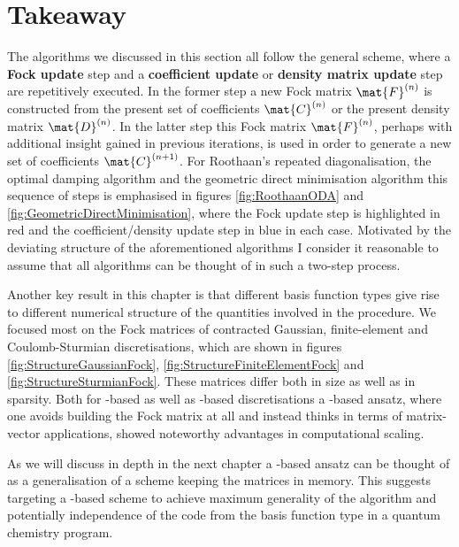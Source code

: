 \section{Takeaway}
The \SCF algorithms we discussed in this section all follow the general scheme,
where a \textbf{Fock update} step and
a \textbf{coefficient update} or \textbf{density matrix update}
step are repetitively executed.
In the former step a new Fock matrix $\mat{F}^{(n)}$ is constructed from
the present set of \SCF coefficients $\mat{C}^{(n)}$
or the present density matrix $\mat{D}^{(n)}$.
In the latter step this Fock matrix $\mat{F}^{(n)}$,
perhaps with additional insight gained in previous iterations,
is used in order to generate a new set of coefficients $\mat{C}^{(n+1)}$.
For Roothaan's repeated diagonalisation,
the optimal damping algorithm and the geometric direct minimisation algorithm
this sequence of steps is emphasised in figures
\vref{fig:RoothaanODA} and \vref{fig:GeometricDirectMinimisation},
where the Fock update step is highlighted in red
and the coefficient/density update step in blue in each case.
Motivated by the deviating structure of the aforementioned
algorithms I consider it reasonable
to assume that all \SCF algorithms can be thought of in such
a two-step process.

Another key result in this chapter is
that different basis function types give rise to
different numerical structure
of the quantities involved in the \SCF procedure.
We focused most on the Fock matrices
of contracted Gaussian, finite-element and Coulomb-Sturmian discretisations,
which are shown in figures
\vref{fig:StructureGaussianFock},
\vref{fig:StructureFiniteElementFock}
and \vref{fig:StructureSturmianFock}.
These matrices differ both in size as well as in sparsity.
Both for \FE-based as well as \CS-based
discretisations a \contract-based ansatz,
where one avoids building the Fock matrix at all
and instead thinks in terms of matrix-vector applications,
showed noteworthy advantages in computational scaling.

As we will discuss in depth in the next chapter
a \contract-based ansatz can be thought of as a generalisation
of a scheme keeping the matrices in memory.
This suggests targeting a \contract-based \SCF scheme to achieve
maximum generality of the \SCF algorithm
and potentially independence of the \SCF code from
the basis function type in a quantum chemistry program.

